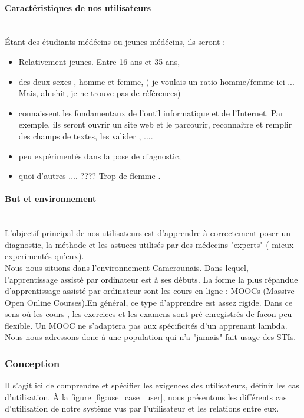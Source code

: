     \paragraph{Caractéristiques de nos utilisateurs} \hfill \\
    Étant des étudiants médécins ou jeunes médécins, ils seront :
    \begin{itemize}
        \item Relativement jeunes. Entre 16 ans et 35 ans,
        \item des deux sexes , homme et femme, ( je voulais un ratio homme/femme ici ... Mais, ah shit, je ne trouve pas de références)
        \item connaissent les fondamentaux de l'outil informatique et de l'Internet. Par exemple, ils seront ouvrir un site web et le parcourir, reconnaitre et remplir des champs de textes, les valider , ....
        
        \item peu expérimentés dans la pose de diagnostic,
        
        \item quoi d'autres .... ???? Trop de flemme .
    
    \end{itemize}
    
    \paragraph{But et environnement} \hfill \\
    L'objectif principal de nos utilisateurs est d'apprendre à correctement poser un diagnostic, la méthode et les astuces utilisés par des médecins "experts" ( mieux experimentés qu'eux). \\
    Nous nous situons dans l'environnement Camerounais. Dans lequel, l'apprentissage assisté par ordinateur est à ses débuts. La forme la plus répandue d'apprentissage assisté par ordinateur sont les cours en ligne : MOOCs (Massive Open Online Courses).En général, ce type d'apprendre est assez rigide. Dans ce sens où les cours , les exercices et les examens sont pré enregistrés de facon peu flexible. Un MOOC ne s'adaptera pas aux spécificités d'un apprenant lambda. Nous nous adressons donc à une population qui n'a "jamais" fait usage des STIs.
    
    \subsubsection{Conception}
    Il s'agit ici de comprendre et spécifier les exigences des utilisateurs, définir les cas d'utilisation.
    À la figure \ref{fig:use_case_user}, nous présentons les différents cas d'utilisation de notre système vus par l'utilisateur et les relations entre eux.
    

